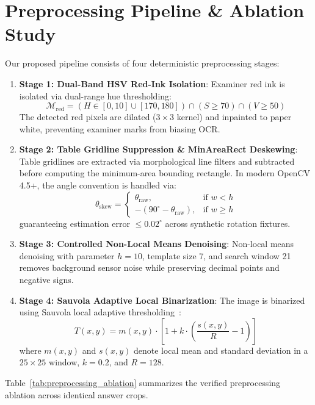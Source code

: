 \documentclass[journal]{IEEEtran}
\begin{document}
\section{Preprocessing Pipeline \& Ablation Study}
Our proposed pipeline consists of four deterministic preprocessing stages:
\begin{enumerate}
    \item \textbf{Stage 1: Dual-Band HSV Red-Ink Isolation}: Examiner red ink is isolated via dual-range hue thresholding:
    \begin{equation}
        \mathcal{M}_{\text{red}} = \left(H \in [0, 10] \cup [170, 180]\right) \cap (S \ge 70) \cap (V \ge 50)
    \end{equation}
    The detected red pixels are dilated ($3 \times 3$ kernel) and inpainted to paper white, preventing examiner marks from biasing OCR.
    \item \textbf{Stage 2: Table Gridline Suppression \& MinAreaRect Deskewing}: Table gridlines are extracted via morphological line filters and subtracted before computing the minimum-area bounding rectangle. In modern OpenCV 4.5+, the angle convention is handled via:
    \begin{equation}
        \theta_{\text{skew}} = \begin{cases} \theta_{\text{raw}}, & \text{if } w < h \\ -(90^\circ - \theta_{\text{raw}}), & \text{if } w \ge h \end{cases}
    \end{equation}
    guaranteeing estimation error $\le 0.02^\circ$ across synthetic rotation fixtures.
    \item \textbf{Stage 3: Controlled Non-Local Means Denoising}: Non-local means denoising with parameter $h = 10$, template size 7, and search window 21 removes background sensor noise while preserving decimal points and negative signs.
    \item \textbf{Stage 4: Sauvola Adaptive Local Binarization}: The image is binarized using Sauvola local adaptive thresholding~\cite{sauvola2000adaptive}:
    \begin{equation}
        T(x, y) = m(x, y) \cdot \left[1 + k \cdot \left(\frac{s(x, y)}{R} - 1\right)\right]
    \end{equation}
    where $m(x, y)$ and $s(x, y)$ denote local mean and standard deviation in a $25 \times 25$ window, $k = 0.2$, and $R = 128$.
\end{enumerate}

Table~\ref{tab:preprocessing_ablation} summarizes the verified preprocessing ablation across identical answer crops.
\end{document}
